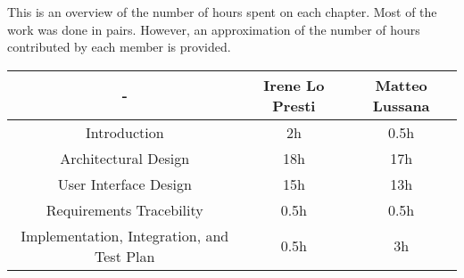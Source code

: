 This is an overview of the number of hours spent on each chapter. Most of the work was done in pairs. However, an approximation of the number of hours contributed by each member is provided.
\begin{table}[]
    \centering
    \begin{tabular}{|c|c|c|}
        \hline
        - & \textbf{Irene Lo Presti} & \textbf{Matteo Lussana} \\\hline
        Introduction & 2h & 0.5h \\\hline
        Architectural Design & 18h & 17h \\\hline
        User Interface Design & 15h & 13h \\\hline
        Requirements Tracebility & 0.5h & 0.5h \\\hline
        Implementation, Integration, and Test Plan & 0.5h & 3h \\\hline
    \end{tabular}
\end{table}